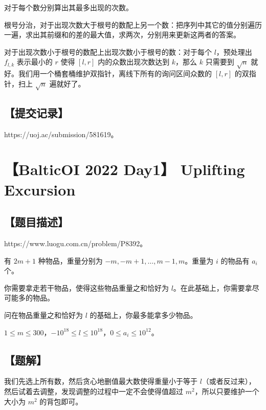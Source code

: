 \documentclass[UTF8,12pt,a4paper]{ctexart}
\begin{document}
	对于每个数分别算出其最多出现的次数。
	
	根号分治，对于出现次数大于根号的数配上另一个数：把序列中其它的值分别遍历一遍，求出其前缀和的差的最大值，求两次，分别用来更新这两者的答案。
	
	对于出现次数小于根号的数配上出现次数小于根号的数：对于每个 $l$，预处理出 $f_{l,k}$ 表示最小的 $r$ 使得 $[l,r]$ 内的众数出现次数达到 $k$，那么 $k$ 只需要到 $\sqrt{n}$ 就好。我们用一个桶套桶维护双指针，离线下所有的询问区间众数的 $[l,r]$ 的双指针，扫上 $\sqrt{n}$ 遍就好了。
	
	\subsection*{【提交记录】}
	
	https://uoj.ac/submission/581619。
	
	
	\section*{【BalticOI 2022 Day1】 Uplifting Excursion}
	
	\subsection*{【题目描述】}
	
	https://www.luogu.com.cn/problem/P8392。
	
	有 $2m+1$ 种物品，重量分别为 $-m,-m+1,\ldots, m-1,m$。重量为 $i$ 的物品有 $a_i$ 个。
	
	你需要拿走若干物品，使得这些物品重量之和恰好为 $l$。在此基础上，你需要拿尽可能多的物品。
	
	问在物品重量之和恰好为 $l$ 的基础上，你最多能拿多少物品。
	
	$1\leq m \leq 300$，$-10^{18}\le l \le 10^{18}$，$0\le a_i\le 10^{12}$。
	
	\subsection*{【题解】}
	
	我们先选上所有数，然后贪心地删值最大数使得重量小于等于 $l$（或者反过来），然后试着去调整，发现调整的过程中一定不会使得值超过 $m^2$，所以只要维护一个大小为 $m^2$ 的背包即可。
	
\end{document}
